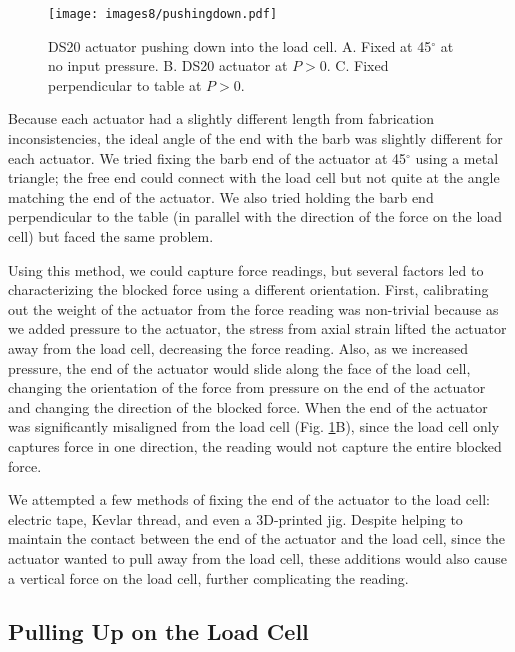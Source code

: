 \begin{figure}[!ht]
    \centering
     \texttt{[image: images8/pushingdown.pdf]}
    \caption{DS20 actuator pushing down into the load cell. A. Fixed at 45$^\circ$ at no input pressure. B. DS20 actuator at $P>0$. C. Fixed perpendicular to table at $P>0$.}
    \label{fig:pushingdown}
\end{figure}

\clearpage
Because each actuator had a slightly different length from fabrication inconsistencies, the ideal angle of the end with the barb was slightly different for each actuator. We tried fixing the barb end of the actuator at 45$^\circ$ using a metal triangle; the free end could connect with the load cell but not quite at the angle matching the end of the actuator. We also tried holding the barb end perpendicular to the table (in parallel with the direction of the force on the load cell) but faced the same problem. 

Using this method, we could capture force readings, but several factors led to characterizing the blocked force using a different orientation. First, calibrating out the weight of the actuator from the force reading was non-trivial because as we added pressure to the actuator, the stress from axial strain lifted the actuator away from the load cell, decreasing the force reading. Also, as we increased pressure, the end of the actuator would slide along the face of the load cell, changing the orientation of the force from pressure on the end of the actuator and changing the direction of the blocked force. When the end of the actuator was significantly misaligned from the load cell (Fig. \ref{fig:pushingdown}B), since the load cell only captures force in one direction, the reading would not capture the entire blocked force. 

We attempted a few methods of fixing the end of the actuator to the load cell: electric tape, Kevlar thread, and even a 3D-printed jig. Despite helping to maintain the contact between the end of the actuator and the load cell, since the actuator wanted to pull away from the load cell, these additions would also cause a vertical force on the load cell, further complicating the reading. 

\clearpage
\subsection{Pulling Up on the Load Cell}

